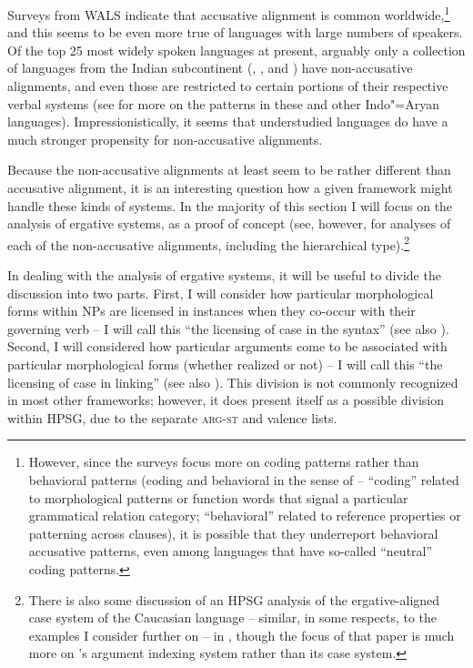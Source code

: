 \documentclass[output=paper
	        ,collection
	        ,collectionchapter
 	        ,biblatex
                ,babelshorthands
                ,newtxmath
                ,draftmode
                ,colorlinks, citecolor=brown
]{langscibook}
\begin{document}
Surveys from WALS \citep{comrieWALSalignfullNP,comrieWALSalignpro,siewierskaWALSalignvp} indicate that accusative alignment is common worldwide,\footnote{However, since the surveys focus more on coding patterns  rather than behavioral patterns  (coding and behavioral in the sense of \citealt{keenan76subjects} -- ``coding'' related to morphological patterns or function words that signal a particular grammatical relation category; ``behavioral'' related to reference properties or patterning across clauses), it is possible that they underreport behavioral accusative patterns, even among languages that have so-called ``neutral'' coding patterns.} and this seems to be even more true of languages with large numbers of speakers. Of the top 25 most widely spoken languages at present, arguably only a collection of languages from the Indian subcontinent (, , and ) have non-accusative alignments, and even those are restricted to certain portions of their respective verbal systems (see \citealt[Chapter 7]{verbeke13} for more on the patterns in these and other Indo"=Aryan languages). Impressionistically, it seems that understudied languages do have a much stronger propensity for non-accusative alignments. 

Because the non-accusative alignments at least seem to be rather different than accusative alignment, it is an interesting question how a given framework might handle these kinds of systems. In the majority of this section I will focus on the analysis of ergative systems, as a proof of concept (see, however, \citealt{Drellishak2009a-u} for analyses of each of the non-accusative alignments, including the hierarchical type).\footnote{There is also some discussion of an HPSG analysis of the ergative-aligned case system of the Caucasian language  -- similar, in some respects, to the  examples I consider further on -- in \citet{borsley16}, though the focus of that paper is much more on 's argument indexing system rather than its case system.}

In dealing with the analysis of ergative systems, it will be useful to divide the discussion into two parts. First, I will consider how particular morphological forms within NPs are licensed in instances when they co-occur with their governing verb -- I will call this ``the licensing of case in the syntax'' (see also ). Second, I will considered how particular arguments come to be associated with particular morphological forms (whether realized or not) -- I will call this ``the licensing of case in linking''  (see also ). This division is not commonly recognized in most other frameworks; however, it does present itself as a possible division within HPSG, due to the separate \textsc{arg-st} and valence lists. 
\end{document}

